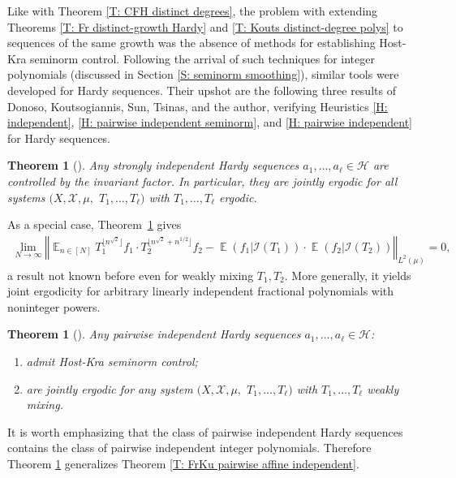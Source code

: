 \documentclass[11pt]{amsart}
\newtheorem{theorem}[lemma]{Theorem}
\theoremstyle{definition}
\DeclareMathOperator*{\E}{\mathbb{E}}
\newcommand{\CH}{{\mathcal H}}
\newcommand{\CI}{{\mathcal I}}
\newcommand{\CX}{{\mathcal X}}
\newcommand{\norm}[1]{\left\Vert #1\right\Vert}
\newcommand{\1}{{\mathbf{1}}}
\newcommand{\sfloor}[1]{{\lfloor #1 \rfloor}}
\begin{document}
Like with Theorem \ref{T: CFH distinct degrees}, the problem with extending Theorems \ref{T: Fr distinct-growth Hardy} and \ref{T: Kouts distinct-degree polys} to sequences of the same growth was the absence of methods for establishing Host-Kra seminorm control. Following the arrival of such techniques for integer polynomials (discussed in Section \ref{S: seminorm smoothing}), similar tools were developed for Hardy sequences. Their upshot are the following three results of Donoso, Koutsogiannis, Sun, Tsinas, and the author, verifying Heuristics \ref{H: independent}, \ref{H: pairwise independent seminorm}, and \ref{H: pairwise independent} for Hardy sequences.
    \begin{theorem}%
    [{\cite[Theorem 1.4]{DKKST24}}]\label{T: DKKST strongly independent Hardy}
     Any strongly independent Hardy sequences $a_1, \ldots, a_\ell\in \CH$ are controlled by the invariant factor. In particular, they are jointly ergodic for all systems $(X, \CX, \mu,$\! $T_1, \ldots, T_\ell)$ with $T_1, \ldots, T_\ell$ ergodic.  
 	\end{theorem}
As a special case, Theorem~\ref{T: DKKST strongly independent Hardy} gives
   \begin{align*}
       \lim_{N\to\infty}\norm{\E_{n\in[N]} T_1^{\sfloor{n^{\sqrt{2}}}}f_1\cdot T_2^{\sfloor{n^{\sqrt{2}}+n^{1/2}}}f_2 - \E(f_1|\CI(T_1))\cdot \E(f_2|\CI(T_2))}_{L^2(\mu)} = 0,
   \end{align*}
   a result not known before even for weakly mixing $T_1, T_2$. More generally, it yields joint ergodicity for arbitrary linearly independent fractional polynomials with noninteger powers.
   
    \begin{theorem}%
    [{\cite[Theorems 1.3 and 1.16]{DKKST24}}]\label{T: DKKST pairwise independent Hardy}
    Any pairwise independent Hardy sequences $a_1, \ldots, a_\ell\in \CH$:
    \begin{enumerate}
        \item admit Host-Kra seminorm control;
        \item are jointly ergodic for any system $(X, \CX, \mu,$\! $T_1, \ldots, T_\ell)$ with $T_1, \ldots, T_\ell$ weakly mixing.
    \end{enumerate}    
    \end{theorem}
    It is worth emphasizing that the class of pairwise independent Hardy sequences contains the class of pairwise independent integer polynomials. Therefore Theorem \ref{T: DKKST pairwise independent Hardy} generalizes Theorem \ref{T: FrKu pairwise affine independent}.
\end{document}
